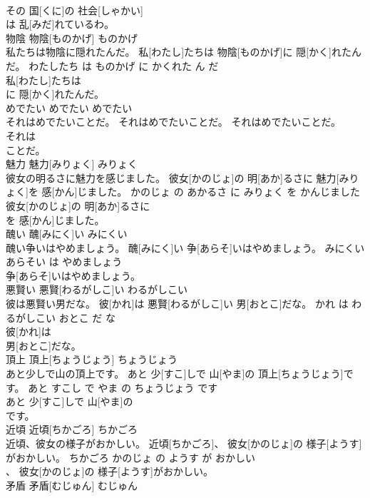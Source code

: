 \documentclass[8pt]{extreport}
\begin{document}
\begin{CJK}{UTF8}{min}
\\	その 国[くに]の 社会[しゃかい]
\\	は 乱[みだ]れているわ。			
\\	物陰	物陰[ものかげ]	ものかげ	
\\	私たちは物陰に隠れたんだ。	私[わたし]たちは 物陰[ものかげ]に 隠[かく]れたんだ。	わたしたち は ものかげ に かくれた ん だ	
\\	私[わたし]たちは
\\	に 隠[かく]れたんだ。			
\\	めでたい	めでたい	めでたい	
\\	それはめでたいことだ。	それはめでたいことだ。	それはめでたいことだ。	
\\	それは
\\	ことだ。			
\\	魅力	魅力[みりょく]	みりょく	
\\	彼女の明るさに魅力を感じました。	彼女[かのじょ]の 明[あか]るさに 魅力[みりょく]を 感[かん]じました。	かのじょ の あかるさ に みりょく を かんじました	
\\	彼女[かのじょ]の 明[あか]るさに
\\	を 感[かん]じました。			
\\	醜い	醜[みにく]い	みにくい	
\\	醜い争いはやめましょう。	醜[みにく]い 争[あらそ]いはやめましょう。	みにくい あらそい は やめましょう	
\\	争[あらそ]いはやめましょう。			
\\	悪賢い	悪賢[わるがしこ]い	わるがしこい	
\\	彼は悪賢い男だな。	彼[かれ]は 悪賢[わるがしこ]い 男[おとこ]だな。	かれ は わるがしこい おとこ だ な	
\\	彼[かれ]は
\\	男[おとこ]だな。			
\\	頂上	頂上[ちょうじょう]	ちょうじょう	
\\	あと少しで山の頂上です。	あと 少[すこ]しで 山[やま]の 頂上[ちょうじょう]です。	あと すこし で やま の ちょうじょう です	
\\	あと 少[すこ]しで 山[やま]の
\\	です。			
\\	近頃	近頃[ちかごろ]	ちかごろ	
\\	近頃、彼女の様子がおかしい。	近頃[ちかごろ]、 彼女[かのじょ]の 様子[ようす]がおかしい。	ちかごろ かのじょ の ようす が おかしい	
\\	、 彼女[かのじょ]の 様子[ようす]がおかしい。			
\\	矛盾	矛盾[むじゅん]	むじゅん	

\end{CJK}
\end{document}
